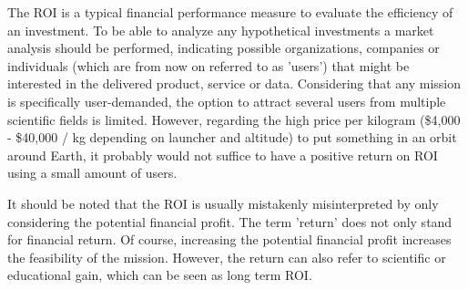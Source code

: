 The \ac{ROI} is a typical financial performance measure to evaluate the efficiency of an investment. To be able to analyze any hypothetical investments a market analysis should be performed, indicating possible organizations, companies or individuals (which are from now on referred to as 'users') that might be interested in the delivered product, service or data. Considering that any mission is specifically user-demanded, the option to attract several users from multiple scientific fields is limited. However, regarding the high price per kilogram (\$4,000 - \$40,000 / kg depending on launcher and altitude) to put something in an orbit around Earth, it probably would not suffice to have a positive return on \acs{ROI} using a small amount of users. 

It should be noted that the \acs{ROI} is usually mistakenly misinterpreted by only considering the potential financial profit. The term 'return' does not only stand for financial return. Of course, increasing the potential financial profit increases the feasibility of the mission. However, the return can also refer to scientific or educational gain, which can be seen as long term \acs{ROI}. 

